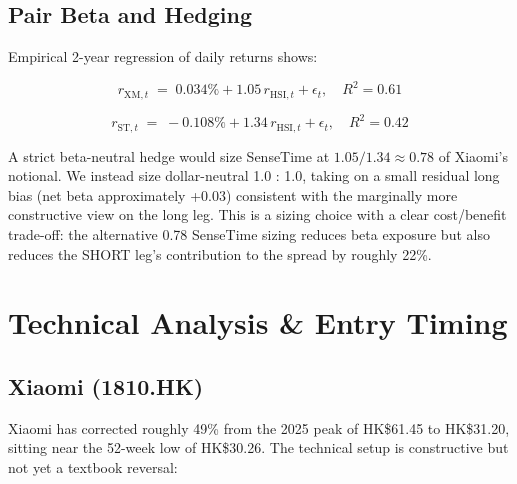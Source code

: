 \documentclass[11pt,a4paper]{article}
\begin{document}
\subsection{Pair Beta and Hedging}

Empirical 2-year regression of daily returns shows:

\begin{equation}
r_{\text{XM},t} \;=\; 0.034\% + 1.05\,r_{\text{HSI},t} + \epsilon_t,\quad R^2 = 0.61
\end{equation}

\begin{equation}
r_{\text{ST},t} \;=\; -0.108\% + 1.34\,r_{\text{HSI},t} + \epsilon_t,\quad R^2 = 0.42
\end{equation}

A strict beta-neutral hedge would size SenseTime at $1.05 / 1.34 \approx 0.78$ of Xiaomi's notional. We instead size dollar-neutral 1.0 : 1.0, taking on a small residual long bias (net beta approximately +0.03) consistent with the marginally more constructive view on the long leg. This is a sizing choice with a clear cost/benefit trade-off: the alternative 0.78 SenseTime sizing reduces beta exposure but also reduces the SHORT leg's contribution to the spread by roughly 22\%.

\newpage
\section{Technical Analysis \& Entry Timing}

\subsection{Xiaomi (1810.HK)}

Xiaomi has corrected roughly 49\% from the 2025 peak of HK\$61.45 to HK\$31.20, sitting near the 52-week low of HK\$30.26. The technical setup is constructive but not yet a textbook reversal:
\end{document}

